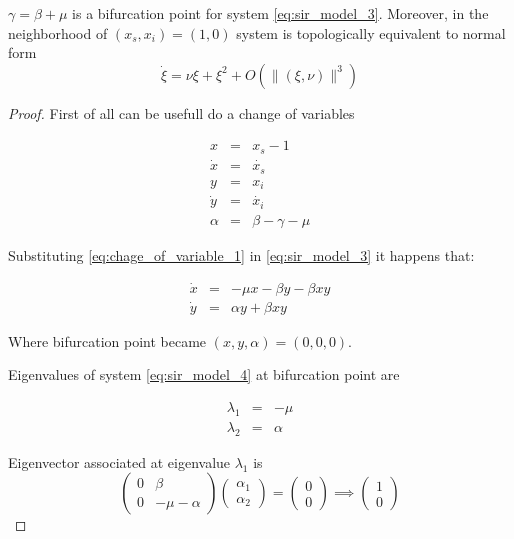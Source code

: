 \begin{theorem}
$\gamma = \beta+\mu$ is a bifurcation point for system \ref{eq:sir_model_3}. Moreover, in the neighborhood of $(x_s,x_i) = (1,0)$ system is topologically equivalent to normal form
\begin{equation}
    \dot{\xi} = \nu\xi + \xi^2 + O\left(\|(\xi,\nu)\|^3\right)
\end{equation}
\end{theorem}

\begin{proof}

First of all can be usefull do a change of variables

\begin{equation}
    \label{eq:chage_of_variable_1}
    \begin{array}{ccc}
    x &=& x_s - 1 \\
    \dot{x} &=& \dot{x_s} \\
    y &=& x_i \\
    \dot{y} &=& \dot{x_i} \\
    \alpha &=& \beta - \gamma - \mu
    \end{array}
\end{equation}

Substituting \ref{eq:chage_of_variable_1} in \ref{eq:sir_model_3} it happens that:

\begin{equation}
    \label{eq:sir_model_4}
    \begin{array}{ccc}
        \dot{x} &=& -\mu x -\beta y - \beta xy \\
        \dot{y} &=& \alpha y +\beta xy
    \end{array}
\end{equation}

Where bifurcation point became $(x,y,\alpha) = (0,0,0)$.

Eigenvalues of system \ref{eq:sir_model_4} at bifurcation point are

\begin{equation}
    \begin{array}{ccc}
        \lambda_1 &=& -\mu \\
        \lambda_2 &=& \alpha
    \end{array}
\end{equation}

Eigenvector associated at eigenvalue $\lambda_1$ is
\begin{equation}
    \begin{pmatrix}
        0 & \beta \\ 0 & -\mu-\alpha
    \end{pmatrix}
    \begin{pmatrix}
        \alpha_1 \\ \alpha_2
    \end{pmatrix} =
    \begin{pmatrix}
        0 \\ 0
    \end{pmatrix}
    \implies
    \begin{pmatrix}
        1 \\ 0
    \end{pmatrix}
\end{equation}


\end{proof}
